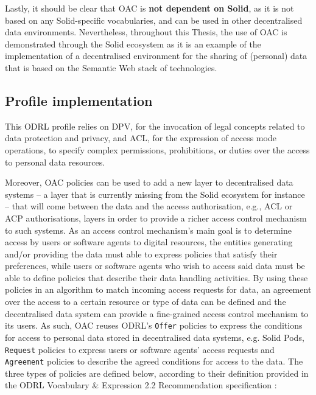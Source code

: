 
Lastly, it should be clear that OAC is \textbf{not dependent on Solid}, as it is not based on any Solid-specific vocabularies, and can be used in other decentralised data environments.
Nevertheless, throughout this Thesis, the use of OAC is demonstrated through the Solid ecosystem as it is an example of the implementation of a decentralised environment for the sharing of (personal) data that is based on the Semantic Web stack of technologies.

\subsection{Profile implementation}
\label{sec:oac_implementation}

This ODRL profile relies on DPV, for the invocation of legal concepts related to data protection and privacy, and ACL, for the expression of access mode operations, to specify complex permissions, prohibitions, or duties over the access to personal data resources.

Moreover, OAC policies can be used to add a new layer to decentralised data systems -- a layer that is currently missing from the Solid ecosystem for instance -- that will come between the data and the access authorisation, e.g., ACL or ACP authorisations, layers in order to provide a richer access control mechanism to such systems.
As an access control mechanism's main goal is to determine access by users or software agents to digital resources, the entities generating and/or providing the data must able to express policies that satisfy their preferences, while users or software agents who wish to access said data must be able to define policies that describe their data handling activities. 
By using these policies in an algorithm to match incoming access requests for data, an agreement over the access to a certain resource or type of data can be defined and the decentralised data system can provide a fine-grained access control mechanism to its users.
As such, OAC reuses ODRL's \texttt{Offer} policies to express the conditions for access to personal data stored in decentralised data systems, e.g. Solid Pods, \texttt{Request} policies to express users or software agents' access requests and \texttt{Agreement} policies to describe the agreed conditions for access to the data. 
The three types of policies are defined below, according to their definition provided in the ODRL Vocabulary \& Expression 2.2 Recommendation specification \citep{iannella_odrl_vocab_2018}:

